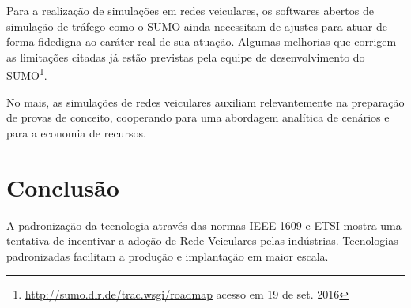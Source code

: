 \documentclass[
12pt,				%
openright,			%
oneside,			%
a4paper,			%
brazil,				%
]{abntex2}
\begin{document}
	\par Para a realização de simulações em redes veiculares, os softwares abertos de simulação de tráfego como o SUMO ainda necessitam de ajustes para atuar de forma fidedigna ao caráter real de sua atuação. Algumas melhorias que corrigem as limitações citadas já estão previstas pela equipe de desenvolvimento do SUMO{\footnote{\href{http://sumo.dlr.de/trac.wsgi/roadmap}{http://sumo.dlr.de/trac.wsgi/roadmap} acesso em 19 de set. 2016}}.
	
	\par No mais, as simulações de redes veiculares auxiliam relevantemente na preparação de provas de conceito, cooperando para uma abordagem analítica de cenários e para a economia de recursos.



	\chapter[Conclusão]{Conclusão}

	\par A padronização da tecnologia através das normas IEEE 1609 e ETSI mostra uma tentativa de incentivar a adoção de Rede Veiculares pelas indústrias. Tecnologias padronizadas facilitam a produção e implantação em maior escala.
\end{document}
